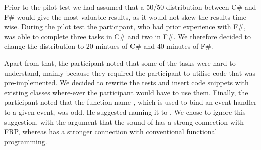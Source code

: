 Prior to the pilot test we had assumed that a 50/50 distribution between C\# and F\# would give the most valuable results, as it would not skew the results time-wise. During the pilot test the participant, who had prior experience with F\#, was able to complete three tasks in C\# and two in F\#. We therefore decided to change the distribution to 20 mintues of C\# and 40 minutes of F\#.

Apart from that, the participant noted that some of the tasks were hard to understand, mainly because they required the participant to utilise code that was pre-implemented. We decided to rewrite the tests and insert code snippets with existing classes where-ever the participant would have to use them. Finally, the participant noted that the function-name , which is used to bind an event handler to a given event, was odd. He suggested naming it to . We chose to ignore this suggestion, with the argument that the sound of  has a strong connection with \gls{FRP}, whereas  has a stronger connection with conventional functional programming.
